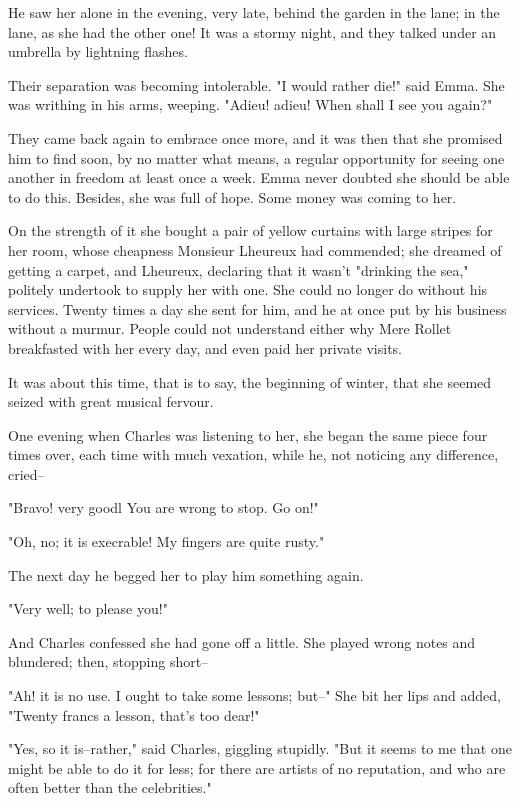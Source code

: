 \documentclass{tufte-book}
\begin{document}
He saw her alone in the evening, very late, behind the garden in the
lane; in the lane, as she had the other one! It was a stormy night, and
they talked under an umbrella by lightning flashes.

Their separation was becoming intolerable. "I would rather die!" said
Emma. She was writhing in his arms, weeping. "Adieu! adieu! When shall I
see you again?"

They came back again to embrace once more, and it was then that
she promised him to find soon, by no matter what means, a regular
opportunity for seeing one another in freedom at least once a week. Emma
never doubted she should be able to do this. Besides, she was full of
hope. Some money was coming to her.

On the strength of it she bought a pair of yellow curtains with large
stripes for her room, whose cheapness Monsieur Lheureux had commended;
she dreamed of getting a carpet, and Lheureux, declaring that it wasn't
"drinking the sea," politely undertook to supply her with one. She could
no longer do without his services. Twenty times a day she sent for him,
and he at once put by his business without a murmur. People could not
understand either why Mere Rollet breakfasted with her every day, and
even paid her private visits.

It was about this time, that is to say, the beginning of winter, that
she seemed seized with great musical fervour.

One evening when Charles was listening to her, she began the same piece
four times over, each time with much vexation, while he, not noticing
any difference, cried--

"Bravo! very goodl You are wrong to stop. Go on!"

"Oh, no; it is execrable! My fingers are quite rusty."

The next day he begged her to play him something again.

"Very well; to please you!"

And Charles confessed she had gone off a little. She played wrong notes
and blundered; then, stopping short--

"Ah! it is no use. I ought to take some lessons; but--" She bit her lips
and added, "Twenty francs a lesson, that's too dear!"

"Yes, so it is--rather," said Charles, giggling stupidly. "But it seems
to me that one might be able to do it for less; for there are artists of
no reputation, and who are often better than the celebrities."
\end{document}
